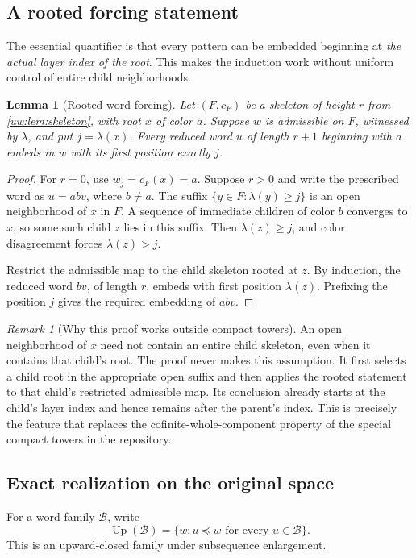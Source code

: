 \documentclass[11pt,letterpaper]{article}
\numberwithin{equation}{section}
\newtheorem{lemma}[lemma]{Lemma}
\theoremstyle{definition}
\theoremstyle{remark}
\newtheorem{remark}[remark]{Remark}
\theoremstyle{definition}
\newcommand{\subseq}{\preccurlyeq}
\begin{document}
\subsection{A rooted forcing statement}
The essential quantifier is that every pattern can be embedded beginning at
\emph{the actual layer index of the root}. This makes the induction work
without uniform control of entire child neighborhoods.

\begin{lemma}[Rooted word forcing]\label{uw:lem:forcing}
Let $(F,c_F)$ be a skeleton of height $r$ from \cref{uw:lem:skeleton}, with root
$x$ of color $a$. Suppose $w$ is admissible on $F$, witnessed by $\lambda$,
and put $j=\lambda(x)$. Every reduced word $u$ of length $r+1$ beginning
with $a$ embeds in $w$ with its first position exactly $j$.
\end{lemma}
\begin{proof}
For $r=0$, use $w_j=c_F(x)=a$. Suppose $r>0$ and write the prescribed word
as $u=abv$, where $b\ne a$. The suffix
$\{y\in F:\lambda(y)\ge j\}$ is an open neighborhood of $x$ in $F$.
A sequence of immediate children of color $b$ converges to $x$, so some such
child $z$ lies in this suffix. Then $\lambda(z)\ge j$, and color disagreement
forces $\lambda(z)>j$.

Restrict the admissible map to the child skeleton rooted at $z$. By induction,
the reduced word $bv$, of length $r$, embeds with first position
$\lambda(z)$. Prefixing the position $j$ gives the required embedding of
$abv$.
\end{proof}

\begin{remark}[Why this proof works outside compact towers]
An open neighborhood of $x$ need not contain an entire child skeleton, even
when it contains that child's root. The proof never makes this assumption.
It first selects a child root in the appropriate open suffix and then applies
the rooted statement to that child's restricted admissible map. Its conclusion
already starts at the child's layer index and hence remains after the parent's
index. This is precisely the feature that replaces the cofinite-whole-component
property of the special compact towers in the repository.
\end{remark}

\subsection{Exact realization on the original space}
For a word family $\mathcal B$, write
\[
 \operatorname{Up}(\mathcal B)=\{w:u\subseq w\text{ for every }u\in\mathcal B\}.
\]
This is an upward-closed family under subsequence enlargement.
\end{document}
